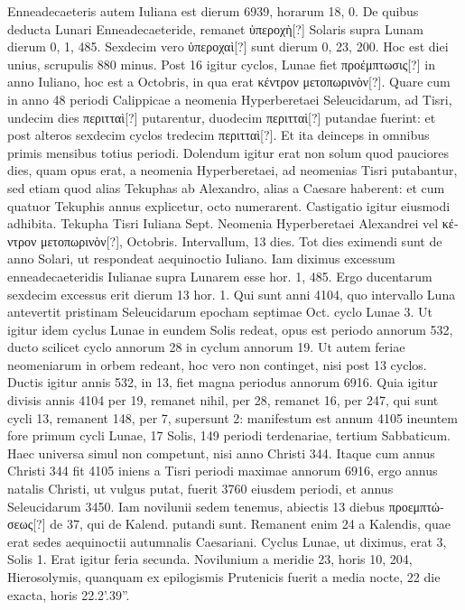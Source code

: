 Enneadecaeteris autem Iuliana est dierum 6939,
horarum 18, 0.
De quibus deducta Lunari Enneadecaeteride, remanet
\textgreek{ὑπεροχὴ[?]} Solaris supra Lunam dierum 0, 1, 485.
Sexdecim vero
\textgreek{ὑπεροχαὶ[?]} sunt dierum 0, 23, 200.
Hoc est diei unius, scrupulis 880
minus.
Post 16 igitur cyclos, Lunae fiet \textgreek{προέμπτωσις[?]}
 in anno Iuliano,
hoc est a  Octobris, in qua erat \textgreek{κέντρον μετοπωρινὸν[?]}.
Quare
cum in anno 48 periodi Calippicae a neomenia Hyperberetaei Seleucidarum,
ad Tisri, undecim dies \textgreek{περιτταὶ[?]} putarentur, duodecim
\textgreek{περιτταὶ[?]} putandae fuerint:
 et post alteros sexdecim cyclos tredecim
\textgreek{περιτταὶ[?]}.
Et ita deinceps in omnibus primis mensibus totius periodi.
Dolendum igitur erat non solum quod pauciores dies, quam opus
erat, a neomenia Hyperberetaei, ad neomenias Tisri putabantur, sed
etiam quod alias Tekuphas ab Alexandro, alias a Caesare haberent:
et cum quatuor Tekuphis annus explicetur, octo numerarent.
Castigatio igitur eiusmodi adhibita.
Tekupha Tisri Iuliana 
Sept. %
Neomenia Hyperberetaei Alexandrei vel \textgreek{κέντρον μετοπωρινὸν[?]},
 Octobris.
Intervallum, 13 dies.
Tot dies eximendi sunt de anno
Solari, ut respondeat aequinoctio Iuliano.
Iam diximus excessum
enneadecaeteridis Iulianae supra Lunarem esse hor. 1, 485. %
Ergo ducentarum
sexdecim excessus erit dierum 13 hor. 1. %
Qui sunt anni
4104, quo intervallo Luna antevertit pristinam Seleucidarum epocham
septimae Oct. cyclo Lunae 3. %
Ut igitur idem cyclus Lunae in
eundem Solis redeat, opus est periodo annorum 532, ducto scilicet
cyclo annorum 28 in cyclum annorum 19.
Ut autem feriae neomeniarum
in orbem redeant, hoc vero non continget, nisi post 13 cyclos.
Ductis igitur annis 532, in 13, fiet magna periodus annorum 6916.
Quia igitur divisis annis 4104 per 19, remanet nihil, per 28, remanet
16, per 247, qui sunt cycli 13, remanent 148, per 7, supersunt 2: manifestum
est annum 4105 ineuntem fore primum cycli Lunae, 17 Solis,
149 periodi terdenariae, tertium Sabbaticum.
Haec universa simul
non competunt, nisi anno Christi 344.
Itaque cum annus Christi
344 fit 4105 iniens a Tisri periodi maximae annorum 6916, ergo
annus natalis Christi, ut vulgus putat, fuerit 3760 eiusdem periodi,
et annus Seleucidarum 3450.
Iam novilunii sedem tenemus,
abiectis 13 diebus \textgreek{προεμπτώσεως[?]} de 37,
 qui de Kalend. putandi %
sunt.
Remanent enim 24 a Kalendis, quae erat sedes aequinoctii autumnalis
Caesariani.
Cyclus Lunae, ut diximus, erat 3, Solis 1.
Erat
igitur feria secunda.
Novilunium a meridie 23, horis 10, 204,
Hierosolymis, quanquam ex epilogismis Prutenicis fuerit a media
nocte, 22 die exacta, horis 22.2'.39''.

